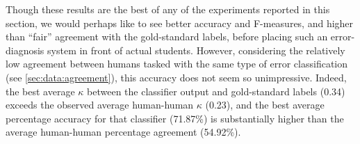 \documentclass[a4paper]{article}
\begin{document}
		
		Though these results are the best of any of the experiments reported in this section, we would perhaps like to see better accuracy and F-measures, and higher than ``fair'' \cite{Landis1977}  agreement with the gold-standard labels, before placing such an error-diagnosis system in front of actual students.
		However, considering the relatively low agreement between humans tasked with the same type of error classification (see \cref{sec:data:agreement}), this accuracy does not seem so unimpressive.
		Indeed, the best average $\kappa$ between the classifier output and gold-standard labels (0.34) exceeds the observed average human-human $\kappa$ (0.23), and the best average percentage accuracy for that classifier (71.87\%) is substantially higher than the average human-human percentage agreement (54.92\%). 
		
\end{document}
